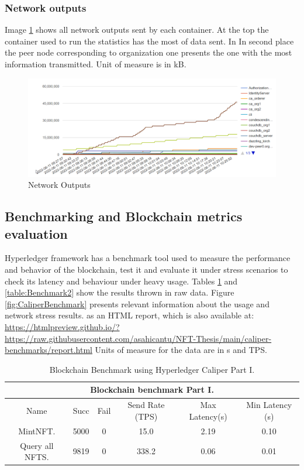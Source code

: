 \subsubsection{Network outputs}
Image \ref{fig:dockerNetOut} shows all network outputs sent by each container. At the top the container used to run the statistics has the most of data sent. In In second place the peer node corresponding to organization one presents the one with the most information transmitted. Unit of measure is in \ac{kB}.
\begin{figure}[h!]
        \centering
        \includegraphics[width=15cm]{img/Docker_NetOut.png}
        \caption{Network Outputs}
        \label{fig:dockerNetOut}
\end{figure}



\subsection{Benchmarking and Blockchain metrics evaluation}
Hyperledger framework has a benchmark tool used to measure the performance and behavior of the blockchain, test it and evaluate it under stress scenarios to check its latency and behaviour under heavy usage. Tables \ref{table:Benchmark1} and \ref{table:Benchmark2} show the results thrown in raw data. Figure \ref{fig:CaliperBenchmark} presents relevant information about the usage and network stress results. as an HTML report, which is also available at:
\url{https://htmlpreview.github.io/?https://raw.githubusercontent.com/asahicantu/NFT-Thesis/main/caliper-benchmarks/report.html} Units of measure for the data are in \ac{s} and \ac{TPS}.

\begin{table}[h!]
\begin{center}
\begin{tabular}{ |c|c|c|c|c|c|  }
 \hline
 \multicolumn{6}{|c|}{Blockchain benchmark Part I.} \\
 \hline
 Name & Succ  & Fail  & Send Rate (TPS) & Max Latency(s) & Min Latency (s)\\
 \hline
 MintNFT.           & 5000   & 0 &   15.0  &  2.19 & 0.10  \\
 Query all NFTS.    & 9819   & 0 &   338.2 &  0.06 & 0.01   \\
 \hline
\end{tabular}
\caption{Blockchain Benchmark using Hyperledger Caliper Part I.}
\label{table:Benchmark1}
\end{center}
\end{table}

